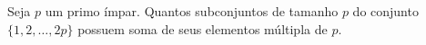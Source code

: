Seja $p$ um primo ímpar. Quantos subconjuntos de tamanho $p$ do conjunto $\{1, 2, \dots, 2p\}$ possuem soma de seus elementos múltipla de $p$.
